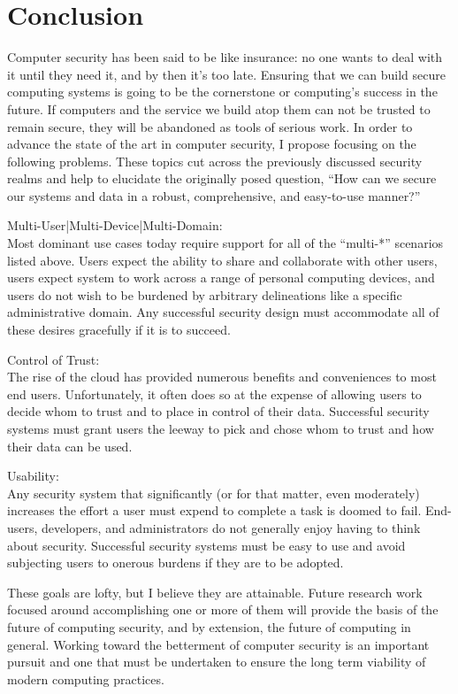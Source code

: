 \documentclass{sig-alternate}
\newenvironment{packed_desc}{
\begin{description}
  \setlength{\itemsep}{1pt}
  \setlength{\parskip}{0pt}
  \setlength{\parsep}{0pt}
}{\end{description}}
\begin{document}
\section{Conclusion}
\label{sec:conclusion}

Computer security has been said to be like insurance: no one wants to
deal with it until they need it, and by then it's too late. Ensuring
that we can build secure computing systems is going to be the
cornerstone or computing's success in the future. If computers and the
service we build atop them can not be trusted to remain secure, they
will be abandoned as tools of serious work. In order to advance the
state of the art in computer security, I propose focusing on the
following problems. These topics cut across the previously discussed
security realms and help to elucidate the originally posed question,
``How can we secure our systems and data in a robust, comprehensive,
and easy-to-use manner?''

\begin{packed_desc}
\item{Multi-User|Multi-Device|Multi-Domain}: \hfill \\ Most dominant
  use cases today require support for all of the ``multi-*'' scenarios
  listed above. Users expect the ability to share and collaborate with
  other users, users expect system to work across a range of personal
  computing devices, and users do not wish to be burdened by arbitrary
  delineations like a specific administrative domain. Any successful
  security design must accommodate all of these desires gracefully if
  it is to succeed.
\item{Control of Trust}: \hfill \\ The rise of the cloud has provided
  numerous benefits and conveniences to most end users. Unfortunately,
  it often does so at the expense of allowing users to decide whom to
  trust and to place in control of their data. Successful security
  systems must grant users the leeway to pick and chose whom to trust
  and how their data can be used.
\item{Usability}: \hfill \\ Any security system that significantly (or
  for that matter, even moderately) increases the effort a user must
  expend to complete a task is doomed to fail. End-users, developers,
  and administrators do not generally enjoy having to think about
  security. Successful security systems must be easy to use and avoid
  subjecting users to onerous burdens if they are to be adopted.
\end{packed_desc}

These goals are lofty, but I believe they are attainable. Future
research work focused around accomplishing one or more of them will
provide the basis of the future of computing security, and by
extension, the future of computing in general. Working toward the
betterment of computer security is an important pursuit and one that
must be undertaken to ensure the long term viability of modern
computing practices.

\vfill
\break



\end{document}
